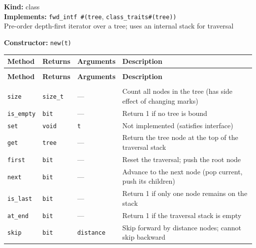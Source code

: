\documentclass[11pt,letterpaper]{report}
\begin{document}
\noindent\textbf{Kind:} class\\
\noindent\textbf{Implements:} \texttt{fwd\_intf \#(tree}, \texttt{class\_traits\#(tree))}\\
\noindent Pre-order depth-first iterator over a tree; uses an internal stack for traversal

\noindent\textbf{Constructor:} \texttt{new(t)}

\begin{xltabular}{\linewidth}{>{\small}p{1.35in} >{\small}p{1.25in} >{\small}p{0.95in} >{\small}X}
\toprule
\textbf{Method} & \textbf{Returns} & \textbf{Arguments} & \textbf{Description} \\
\midrule
\endfirsthead
{} \\
\midrule
\textbf{Method} & \textbf{Returns} & \textbf{Arguments} & \textbf{Description} \\
\midrule
\endhead
\midrule
{} \\
\endfoot
\bottomrule
\endlastfoot
\texttt{size} & \texttt{size\_t} & --- & Count all nodes in the tree (has side effect of changing marks) \\
\texttt{is\_empty} & \texttt{bit} & --- & Return 1 if no tree is bound \\
\texttt{set} & \texttt{void} & \texttt{t} & Not implemented (satisfies interface) \\
\texttt{get} & \texttt{tree} & --- & Return the tree node at the top of the traversal stack \\
\texttt{first} & \texttt{bit} & --- & Reset the traversal; push the root node \\
\texttt{next} & \texttt{bit} & --- & Advance to the next node (pop current, push its children) \\
\texttt{is\_last} & \texttt{bit} & --- & Return 1 if only one node remains on the stack \\
\texttt{at\_end} & \texttt{bit} & --- & Return 1 if the traversal stack is empty \\
\texttt{skip} & \texttt{bit} & \texttt{distance} & Skip forward by distance nodes; cannot skip backward \\
\end{xltabular}
\end{document}
